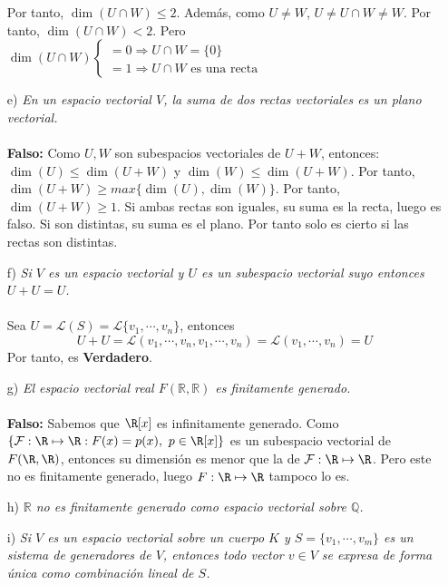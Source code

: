 \begin{ejercicio}
\begin{enumerate}
\begin{equation*}
			\end{equation*}
			Por tanto, $\dim(U \cap W) \leq 2$. Además, como $U \neq W$, $U \neq U \cap W \neq W$. Por tanto, $\dim(U \cap W) < 2.$
			Pero $\dim(U \cap W) \begin{cases}
					= 0 \Rightarrow U \cap W = \{0\} \\
					= 1 \Rightarrow U \cap W \text{ es una recta}
				\end{cases}
			$
		\item[e)] \textit{En un espacio vectorial $V$, la suma de dos rectas vectoriales es un plano vectorial.}
			\\ \\
			\textbf{Falso: } Como $U,W$ son subespacios vectoriales de $U + W$, entonces: $\dim(U) \leq \dim(U + W)$ y $\dim(W) \leq \dim(U + W)$.
			Por tanto, $\dim(U + W) \geq max\{\dim(U), \dim(W)\}$. Por tanto, $\dim(U + W) \geq 1$.
			Si ambas rectas son iguales, su suma es la recta, luego es falso. Si son distintas, su suma es el plano.
			Por tanto solo es cierto si las rectas son distintas.
		\item[f)] \textit{Si $V$ es un espacio vectorial y $U$ es un subespacio vectorial suyo entonces $U + U = U$.}
			\\ \\ Sea $U = \mathcal{L}(S) = \mathcal{L}\{ v_1, \cdots, v_n \}$, entonces
			\begin{equation*}
				U + U = \mathcal{L}(v_1, \cdots, v_n, v_1, \cdots, v_n) = \mathcal{L}(v_1, \cdots, v_n) = U
			\end{equation*}
			Por tanto, es \textbf{Verdadero}.
		\item[g)] \textit{El espacio vectorial real $F(\mathbb{R}, \mathbb{R})$ es finitamente generado.}
			\\ \\
			\textbf{Falso: } Sabemos que $\R[x]$ es infinitamente generado. Como
			$\{ \mathcal{F} : \R \mapsto \R : F(x) = p(x), \ p \in \R[x] \}$ es un subespacio vectorial
			de $F(\R, \R)$, entonces su dimensión es menor que la de $\mathcal{F} : \R \mapsto \R$. Pero este no es finitamente generado,
			luego $F: \R \mapsto \R$ tampoco lo es.
		\item[h)] \textit{$\mathbb{R}$ no es finitamente generado como espacio vectorial sobre $\mathbb{Q}$.}
		\item[i)] \textit{Si $V$ es un espacio vectorial sobre un cuerpo $K$ y $S = \{v_1, \cdots, v_m\}$ es un sistema de generadores de $V$, entonces
				todo vector $v \in V$ se expresa de forma única como combinación lineal de $S$.}

\end{enumerate}
\end{ejercicio}
